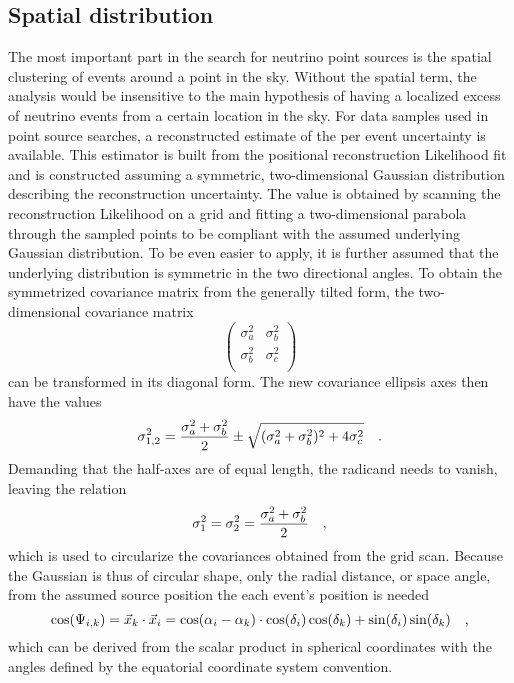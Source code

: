 \subsection{Spatial distribution}
  \label{chp:pointsource_signal_pdf}
The most important part in the search for neutrino point sources is the spatial clustering of events around a point in the sky.
Without the spatial term, the analysis would be insensitive to the main hypothesis of having a localized excess of neutrino events from a certain location in the sky.
For data samples used in point source searches, a reconstructed estimate of the per event uncertainty is available.
This estimator is built from the positional reconstruction Likelihood fit and is constructed assuming a symmetric, two-dimensional Gaussian distribution describing the reconstruction uncertainty.
The value is obtained by scanning the reconstruction Likelihood on a grid and fitting a two-dimensional parabola through the sampled points to be compliant with the assumed underlying Gaussian distribution.
To be even easier to apply, it is further assumed that the underlying distribution is symmetric in the two directional angles.
To obtain the symmetrized covariance matrix from the generally tilted form, the two-dimensional covariance matrix
\begin{equation}
  \begin{pmatrix}
    \sigma_a^2 & \sigma_b^2 \\
    \sigma_b^2 & \sigma_c^2 \\
  \end{pmatrix}
\end{equation}
can be transformed in its diagonal form.
The new covariance ellipsis axes then have the values
\begin{equation}
  \sigma_{1,2}^2 = \frac{\sigma_a^2+\sigma_b^2}{2} \pm
    \sqrt{(\sigma_a^2 + \sigma_b^2)^2 + 4\sigma_c^2}
  \quad\text{.}
\end{equation}
Demanding that the half-axes are of equal length, the radicand needs to vanish, leaving the relation
\begin{equation}
  \sigma_1^2 = \sigma_2^2 = \frac{\sigma_a^2+\sigma_b^2}{2}
  \quad\text{,}
\end{equation}
which is used to circularize the covariances obtained from the grid scan.
Because the Gaussian is thus of circular shape, only the radial distance, or space angle, from the assumed source position the each event's position is needed
\begin{equation}
  \cos(\Psi_{i,k})
  = \vec{x}_k \cdot \vec{x}_i
  = \cos(\alpha_i - \alpha_k) \cdot
    \cos(\delta_i)\cos(\delta_k) +
    \sin(\delta_i)\sin(\delta_k)
  \quad\text{,}
\end{equation}
which can be derived from the scalar product in spherical coordinates with the angles defined by the equatorial coordinate system convention.

